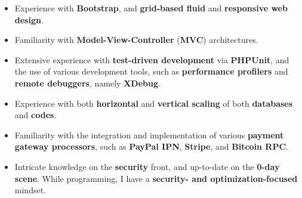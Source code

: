 \documentclass[11pt,a4paper,sans]{moderncv}
\begin{document}
\begin{itemize}
\begin{itemize}
		\item	Experience with \textbf{Bootstrap}, and \textbf{grid-based fluid} and \textbf{responsive web design}.
		\item	Familiarity with \textbf{Model-View-Controller} (\textbf{MVC}) architectures.
		\item	Extensive experience with \textbf{test-driven development} via \textbf{PHPUnit}, and the use of various development tools, such as \textbf{performance profilers} and \textbf{remote debuggers}, namely \textbf{XDebug}.
		\item	Experience with both \textbf{horizontal} and \textbf{vertical scaling} of both \textbf{databases} and \textbf{codes}.
		\item	Familiarity with the integration and implementation of various \textbf{payment gateway processors}, such as \textbf{PayPal IPN}, \textbf{Stripe}, and \textbf{Bitcoin RPC}.
		\item	Intricate knowledge on the \textbf{security} front, and up-to-date on the \textbf{0-day scene}. While programming, I have a \textbf{security- and optimization-focused} mindset.
		\end{itemize}
	\end{itemize}

	\vspace{7pt}
\end{document}
